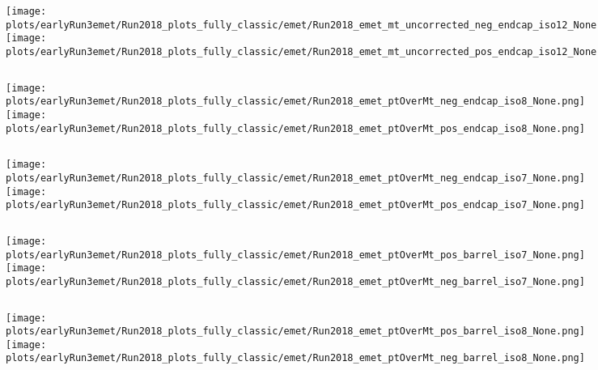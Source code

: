 \documentclass[en,16:9,navbarinfooter]{presentation/sdqbeamer}
\begin{document}
\begin{frame}{\insertsubsection}
   \begin{columns}
   \texttt{[image: plots/earlyRun3emet/Run2018\_plots\_fully\_classic/emet/Run2018\_emet\_mt\_uncorrected\_neg\_endcap\_iso12\_None.png]}
   \texttt{[image: plots/earlyRun3emet/Run2018\_plots\_fully\_classic/emet/Run2018\_emet\_mt\_uncorrected\_pos\_endcap\_iso12\_None.png]}
\end{columns}
\end{frame}

\begin{frame}{\insertsubsection}
   \begin{columns}
   \texttt{[image: plots/earlyRun3emet/Run2018\_plots\_fully\_classic/emet/Run2018\_emet\_ptOverMt\_neg\_endcap\_iso8\_None.png]}
   \texttt{[image: plots/earlyRun3emet/Run2018\_plots\_fully\_classic/emet/Run2018\_emet\_ptOverMt\_pos\_endcap\_iso8\_None.png]}
\end{columns}
\end{frame}

\begin{frame}{\insertsubsection}
   \begin{columns}
   \texttt{[image: plots/earlyRun3emet/Run2018\_plots\_fully\_classic/emet/Run2018\_emet\_ptOverMt\_neg\_endcap\_iso7\_None.png]}
   \texttt{[image: plots/earlyRun3emet/Run2018\_plots\_fully\_classic/emet/Run2018\_emet\_ptOverMt\_pos\_endcap\_iso7\_None.png]}
\end{columns}
\end{frame}

\begin{frame}{\insertsubsection}
   \begin{columns}
   \texttt{[image: plots/earlyRun3emet/Run2018\_plots\_fully\_classic/emet/Run2018\_emet\_ptOverMt\_pos\_barrel\_iso7\_None.png]}
   \texttt{[image: plots/earlyRun3emet/Run2018\_plots\_fully\_classic/emet/Run2018\_emet\_ptOverMt\_neg\_barrel\_iso7\_None.png]}
\end{columns}
\end{frame}

\begin{frame}{\insertsubsection}
   \begin{columns}
   \texttt{[image: plots/earlyRun3emet/Run2018\_plots\_fully\_classic/emet/Run2018\_emet\_ptOverMt\_pos\_barrel\_iso8\_None.png]}
   \texttt{[image: plots/earlyRun3emet/Run2018\_plots\_fully\_classic/emet/Run2018\_emet\_ptOverMt\_neg\_barrel\_iso8\_None.png]}
\end{columns}
\end{frame}
\end{document}

